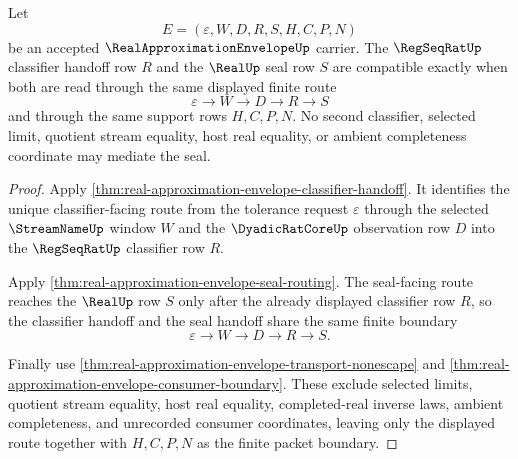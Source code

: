 \begin{theorem}
\label{thm:real-approximation-envelope-seal-classifier-compatibility}
Let
$$
E=(\varepsilon,W,D,R,S,H,C,P,N)
$$
be an accepted $\RealApproximationEnvelopeUp$ carrier. The $\RegSeqRatUp$ classifier handoff row $R$ and the $\RealUp$ seal row $S$ are compatible exactly when both are read through the same displayed finite route
$$
\varepsilon \longrightarrow W \longrightarrow D \longrightarrow R \longrightarrow S
$$
and through the same support rows $H,C,P,N$. No second classifier, selected limit, quotient stream equality, host real equality, or ambient completeness coordinate may mediate the seal.
\end{theorem}
\begin{proof}
Apply \autoref{thm:real-approximation-envelope-classifier-handoff}. It identifies the unique classifier-facing route from the tolerance request $\varepsilon$ through the selected $\StreamNameUp$ window $W$ and the $\DyadicRatCoreUp$ observation row $D$ into the $\RegSeqRatUp$ classifier row $R$.

Apply \autoref{thm:real-approximation-envelope-seal-routing}. The seal-facing route reaches the $\RealUp$ row $S$ only after the already displayed classifier row $R$, so the classifier handoff and the seal handoff share the same finite boundary
$$
\varepsilon \longrightarrow W \longrightarrow D \longrightarrow R \longrightarrow S.
$$

Finally use \autoref{thm:real-approximation-envelope-transport-nonescape} and \autoref{thm:real-approximation-envelope-consumer-boundary}. These exclude selected limits, quotient stream equality, host real equality, completed-real inverse laws, ambient completeness, and unrecorded consumer coordinates, leaving only the displayed route together with $H,C,P,N$ as the finite packet boundary.
\end{proof}

